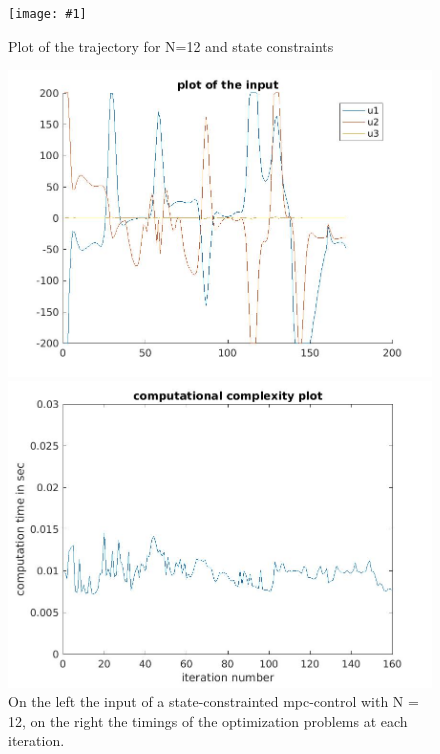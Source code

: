 \documentclass[•]{article}
\newcommand{\apicture}[2] {
  \begin{figure}[H]
  \centering
  \texttt{[image: \#1]}
  \caption{#2}
  \end{figure}
  }
\begin{document}
\apicture{mpctrajssconstr12.jpg}{Plot of the trajectory for N=12 and state constraints}

\begin{figure}[H]
\begin{minipage}{.45\textwidth}
\includegraphics[width = \textwidth]{mpcinputssconstr12.jpg}
\end{minipage}
\begin{minipage}{.45\textwidth}
\includegraphics[width = \textwidth]{comptimessconstr12.jpg}
\end{minipage}
\caption{On the left the input of a state-constrainted mpc-control with N = 12, on the right the timings of the optimization problems at each iteration.}
\end{figure}
\end{document}
